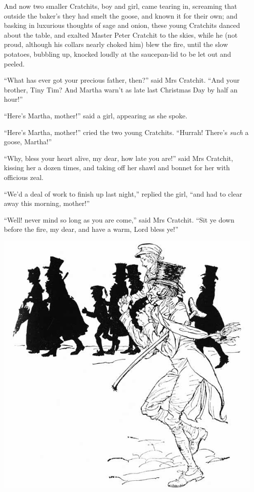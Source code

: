 \documentclass[paper=5.5in:8.5in,BCOR=5mm,twoside,DIV=calc,12pt,usegeometry]{scrbook} %
\begin{document}
And now two smaller Cratchits, boy and girl, came tearing in, screaming that outside the baker's they had smelt the goose, and known it for their own; and basking in luxurious thoughts of sage and onion, these young Cratchits danced about the table, and exalted Master Peter Cratchit to the skies, while he (not proud, although his collars nearly choked him) blew the fire, until the slow potatoes, bubbling up, knocked loudly at the saucepan-lid to be let out and peeled.



\enquote{What has ever got your precious father, then?} said Mrs Cratchit. \enquote{And your brother, Tiny Tim? And Martha warn't as late last Christmas Day by half an hour!}

\enquote{Here's Martha, mother!} said a girl, appearing as she spoke.

\enquote{Here's Martha, mother!} cried the two young Cratchits. \enquote{Hurrah! There's \textit{such} a goose, Martha!}

\enquote{Why, bless your heart alive, my dear, how late you are!} said Mrs Cratchit, kissing her a dozen times, and taking off her shawl and bonnet for her with officious zeal.

\enquote{We'd a deal of work to finish up last night,} replied the girl, \enquote{and had to clear away this morning, mother!}


\enquote{Well! never mind so long as you are come,} said Mrs Cratchit. \enquote{Sit ye down before the fire, my dear, and have a warm, Lord bless ye!}



\clearpage

 \begin{center}
     \vfill%
     \includegraphics[width=\columnwidth]{gs109b}
 \end{center}
\end{document}
